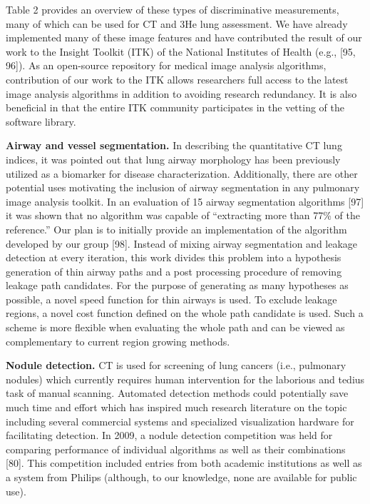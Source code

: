 \documentclass[11pt,]{article}
\begin{document}


Table 2 provides an overview of these types of discriminative
measurements, many of which can be used for CT and 3He lung assessment.
We have already implemented many of these image features and have
contributed the result of our work to the Insight Toolkit (ITK) of the
National Institutes of Health (e.g., {[}95, 96{]}). As an open-source
repository for medical image analysis algorithms, contribution of our
work to the ITK allows researchers full access to the latest image
analysis algorithms in addition to avoiding research redundancy. It is
also beneficial in that the entire ITK community participates in the
vetting of the software library.

\textbf{Airway and vessel segmentation.} In describing the quantitative
CT lung indices, it was pointed out that lung airway morphology has been
previously utilized as a biomarker for disease characterization.
Additionally, there are other potential uses motivating the inclusion of
airway segmentation in any pulmonary image analysis toolkit. In an
evaluation of 15 airway segmentation algorithms {[}97{]} it was shown
that no algorithm was capable of ``extracting more than 77\% of the
reference.'' Our plan is to initially provide an implementation of the
algorithm developed by our group {[}98{]}. Instead of mixing airway
segmentation and leakage detection at every iteration, this work divides
this problem into a hypothesis generation of thin airway paths and a
post processing procedure of removing leakage path candidates. For the
purpose of generating as many hypotheses as possible, a novel speed
function for thin airways is used. To exclude leakage regions, a novel
cost function defined on the whole path candidate is used. Such a scheme
is more flexible when evaluating the whole path and can be viewed as
complementary to current region growing methods.

\textbf{Nodule detection.} CT is used for screening of lung cancers
(i.e., pulmonary nodules) which currently requires human intervention
for the laborious and tedius task of manual scanning. Automated
detection methods could potentially save much time and effort which has
inspired much research literature on the topic including several
commercial systems and specialized visualization hardware for
facilitating detection. In 2009, a nodule detection competition was held
for comparing performance of individual algorithms as well as their
combinations {[}80{]}. This competition included entries from both
academic institutions as well as a system from Philips (although, to our
knowledge, none are available for public use).
\end{document}
